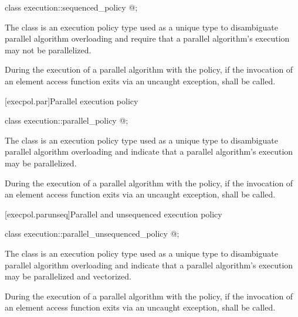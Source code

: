 %
\begin{itemdecl}
class execution::sequenced_policy { @\unspec@ };
\end{itemdecl}

\begin{itemdescr}
\pnum
The class  is an execution policy type used
as a unique type to disambiguate parallel algorithm overloading and require
that a parallel algorithm's execution may not be parallelized.

\pnum
During the execution of a parallel algorithm with
the  policy,
if the invocation of an element access function exits via an uncaught exception,
 shall be called.
\end{itemdescr}

[execpol.par]{Parallel execution policy}

%
\begin{itemdecl}
class execution::parallel_policy { @\unspec@ };
\end{itemdecl}

\begin{itemdescr}
\pnum
The class  is an execution policy type used as
a unique type to disambiguate parallel algorithm overloading and indicate that
a parallel algorithm's execution may be parallelized.

\pnum
During the execution of a parallel algorithm with
the  policy,
if the invocation of an element access function exits via an uncaught exception,
 shall be called.
\end{itemdescr}

[execpol.parunseq]{Parallel and unsequenced execution policy}

%
\begin{itemdecl}
class execution::parallel_unsequenced_policy { @\unspec@ };
\end{itemdecl}

\begin{itemdescr}
\pnum
The class  is an execution policy type
used as a unique type to disambiguate parallel algorithm overloading and
indicate that a parallel algorithm's execution may be parallelized and
vectorized.

\pnum
During the execution of a parallel algorithm with
the  policy,
if the invocation of an element access function exits via an uncaught exception,
 shall be called.
\end{itemdescr}

